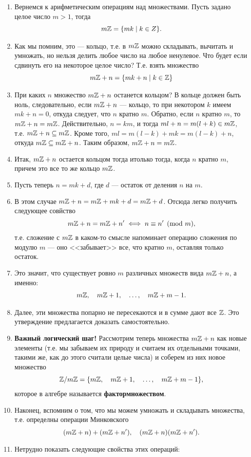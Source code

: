 \begin{enumerate}
\item Вернемся к арифметическим операциям над множествами. Пусть задано целое число $m>1$, тогда
$$
m\mathbb Z = \{mk\mid k\in Z\}.
$$
\item Как мы помним, это --- кольцо, т.е. в $m\mathbb Z$ можно складывать, вычитать и умножать, но нельзя делить любое число на любое ненулевое. Что будет если сдвинуть его на некоторое целое число? Т.е. взять множество
$$
m\mathbb Z+n = \{mk+n\mid k\in\mathbb Z\}
$$
\item При каких $n$ множество $m\mathbb Z+n$ останется кольцом? В кольце должен быть ноль, следовательно, если $m\mathbb Z+n$ --- кольцо, то при некотором $k$ имеем $mk+n=0$, откуда следует, что $n$ кратно $m$. Обратно, если $n$ кратно $m$, то $m\mathbb Z+n=m\mathbb Z$. Действительно, $n=km$, и тогда $ml+n=m(l+k)\in m\mathbb Z$, т.е. $m\mathbb Z+n\subseteq m\mathbb Z$. Кроме того, $ml=m(l-k)+mk=m(l-k)+n$, откуда $m\mathbb Z\subseteq m\mathbb Z+n$. Таким образом, $m\mathbb Z+n=m\mathbb Z$.
\item Итак, $m\mathbb Z+n$ остается кольцом тогда итолько тогда, когда $n$ кратно $m$, причем это все то же кольцо $m\mathbb Z$.
\item Пусть теперь $n=mk+d$, где $d$ --- остаток от деления $n$ на $m$.
\item В этом случае $m\mathbb Z+n=m\mathbb Z+mk+d=m\mathbb Z+d$. Отсюда легко получить следующее совйство
$$
m\mathbb Z+n = m\mathbb Z+n' \iff n\equiv n' \pmod m,
$$
т.е. сложение с $m\mathbb Z$ в каком-то смысле напоминает операцию сложения по модулю $m$ --- оно <<забывает>> все, что кратно $m$, оставляя только остаток.
\item Это значит, что существует ровно $m$ различных множеств вида $m\mathbb Z+n$, а именно:
$$
m\mathbb Z,\quad m\mathbb Z+1,\quad\dots,\quad m\mathbb Z+m-1.
$$
\item Далее, эти множества попарно не пересекаются и в сумме дают все $\mathbb Z$. Это утверждение предлагается доказать самостоятельно.
\item \textbf{Важный логический шаг!} Рассмотрим теперь множества $m\mathbb Z+n$ как новые элементы (т.е. мы забываем их природу и считаем их отдельными точками, такими же, как до этого считали целые числа) и соберем из них новое множество
$$
\mathbb Z/m\mathbb Z = \{m\mathbb Z,\quad m\mathbb Z+1,\quad\dots,\quad m\mathbb Z+m-1\},
$$
которое в алгебре называется \textbf{фактормножеством}.
\item Наконец, вспомним о том, что мы можем умножать и складывать множества, т.е. определны операции Минковского
$$
(m\mathbb Z+n)+(m\mathbb Z+n'),\quad (m\mathbb Z+n)(m\mathbb Z+n').
$$
\item Нетрудно показать следующие свойства этих операций:
\begin{enumerate}[Z1]

\end{enumerate}
\end{enumerate}
